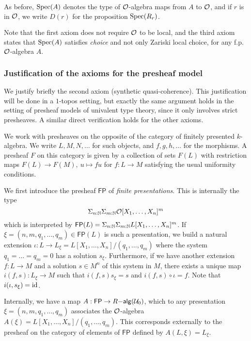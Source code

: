 As before, $\operatorname{Spec}(A)$ denotes the type of $\mathcal O$-algebra maps from $A$ to $\mathcal O$, and
if $r$ is in $\mathcal O$, we write $D(r)$ for the proposition $\operatorname{Spec}(R_r)$.

Note that the first axiom does not require
$\mathcal O$ to be local, and the third axiom states that $\operatorname{Spec}(A)$ satisfies \emph{choice} and not only Zariski local choice,
for any f.p. $\mathcal O$-algebra $A$.


\subsubsection{Justification of the axioms for the presheaf model}

\newcommand{\FP}{\mathsf{FP}}

We justify briefly the second axiom (synthetic quasi-coherence). This justification will be done
in a $1$-topos setting, but exactly the same argument holds in the setting of presheaf models of
univalent type theory, since it only involves strict presheaves. A similar direct verification holds
for the other axioms.

We work with presheaves on the opposite of the category of finitely presented $k$-algebra. We write
$L,M,N,\dots$ for such objects, and $f,g,h,\dots$ for the morphisms. A presheaf $F$ on this category is given
by a collection of sets $F(L)$ with restriction maps $F(L)\rightarrow F(M),~u\mapsto f u$ for
$f:L\rightarrow M$ satisfying the usual uniformity conditions.

We first introduce the presheaf $\FP$ of {\em finite presentations}. This is internally the type
$$
\Sigma_{n:\mathbb{N}}\Sigma_{m:\mathbb{N}}\mathcal O[X_1,\dots,X_n]^m
$$
which is interpreted by $\FP(L) = \Sigma_{n:\nats}\Sigma_{m:\nats}L[X_1,\dots,X_n]^m$.
If $\xi = (n,m,q_1,\dots,q_m)\in\FP(L)$ is such a presentation, we build a natural extension
$\iota:L\rightarrow L_{\xi} = L[X_1,\dots,X_n]/(q_1,\dots,q_m)$ where the system $q_1 = \dots = q_m = 0$
has a solution $s_{\xi}$. Furthermore, if we have another extension $f:L\rightarrow M$
and a solution $s\in M^n$ of this system in $M$, there exists a unique map $i(f,s):L_{\xi}\rightarrow M$
such that $i(f,s) s_{\xi} = s$ and $i(f,s)\circ \iota = f$.
Note that $i(\iota,s_{\xi}) = \mathrm{id}$.

\medskip

Internally, we have a map $A:\FP\rightarrow R\mathsf{-alg}(\UU_0)$, which to any presentation
$\xi = (n,m,q_1,\dots,q_m)$ associates the $\mathcal O$-algebra $A(\xi) = L[X_1,\dots,X_n]/(q_1,\dots,q_m)$.
This corresponds externally to the presheaf on the category of elements of $\FP$ defined
by $A(L,\xi) = L_{\xi}$.

